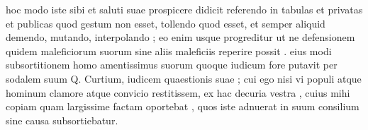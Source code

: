  hoc modo iste sibi et saluti suae prospicere didicit referendo in tabulas et privatas et publicas quod gestum non esset, tollendo quod esset, et semper aliquid demendo, mutando, interpolando ; eo enim usque progreditur ut ne defensionem quidem maleficiorum suorum sine aliis maleficiis reperire possit . eius modi subsortitionem homo amentissimus suorum quoque iudicum fore putavit per sodalem suum Q. Curtium, iudicem quaestionis suae ; cui ego nisi vi populi atque hominum clamore atque convicio restitissem, ex hac decuria vestra , cuius mihi copiam quam largissime factam oportebat , quos iste adnuerat in suum consilium sine causa subsortiebatur.
